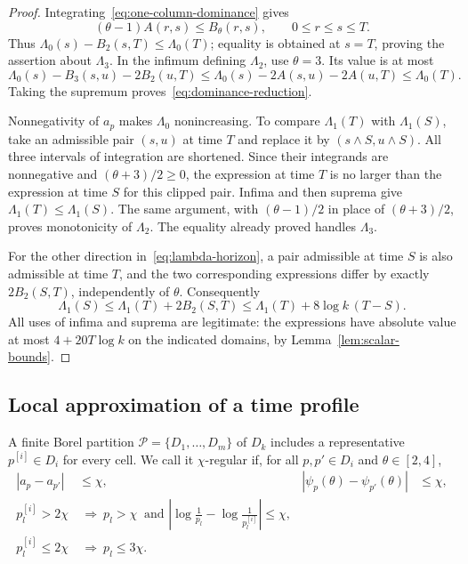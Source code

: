 \documentclass[11pt]{article}
\numberwithin{equation}{section}
\theoremstyle{definition}
\theoremstyle{remark}
\newcommand{\1}{\mathbf 1}
\begin{document}
\begin{proof}
Integrating~\eqref{eq:one-column-dominance} gives
\[
 (\theta-1)A(r,s)\le B_\theta(r,s),\qquad 0\le r\le s\le T.
\]
Thus $\Lambda_0(s)-B_2(s,T)\le\Lambda_0(T)$; equality is obtained at
$s=T$, proving the assertion about $\Lambda_3$. In the infimum defining
$\Lambda_2$, use $\theta=3$. Its value is at most
\[
 \Lambda_0(s)-B_3(s,u)-2B_2(u,T)
 \le\Lambda_0(s)-2A(s,u)-2A(u,T)
 \le\Lambda_0(T).
\]
Taking the supremum proves~\eqref{eq:dominance-reduction}.

Nonnegativity of $a_p$ makes $\Lambda_0$ nonincreasing. To compare
$\Lambda_1(T)$ with $\Lambda_1(S)$, take an admissible pair $(s,u)$ at
time $T$ and replace it by $(s\wedge S,u\wedge S)$. All three intervals
of integration are shortened. Since their integrands are nonnegative
and $(\theta+3)/2\ge0$, the expression at time $T$ is no larger than
the expression at time $S$ for this clipped pair. Infima and then
suprema give $\Lambda_1(T)\le\Lambda_1(S)$. The same argument, with
$(\theta-1)/2$ in place of $(\theta+3)/2$, proves monotonicity of
$\Lambda_2$. The equality already proved handles $\Lambda_3$.

For the other direction in~\eqref{eq:lambda-horizon}, a pair admissible
at time $S$ is also admissible at time $T$, and the two corresponding
expressions differ by exactly $2B_2(S,T)$, independently of $\theta$.
Consequently
\[
 \Lambda_1(S)\le\Lambda_1(T)+2B_2(S,T)
 \le\Lambda_1(T)+8\log k\,(T-S).
\]
All uses of infima and suprema are legitimate: the expressions have
absolute value at most $4+20T\log k$ on the indicated domains, by
Lemma~\ref{lem:scalar-bounds}.
\end{proof}

\subsection{Local approximation of a time profile}
\label{subsec:profile-approximation}

A finite Borel partition $\mathcal P=\{D_1,\ldots,D_m\}$ of $D_k$
includes a representative $p^{[i]}\in D_i$ for every cell. We call it
$\chi$-regular if, for all $p,p'\in D_i$ and $\theta\in[2,4]$,
\begin{align}%
\label{eq:partition-regularity}
 |a_p-a_{p'}|&\le\chi,&
 |\psi_p(\theta)-\psi_{p'}(\theta)|&\le\chi,\nonumber\\
 p^{[i]}_l>2\chi&\ \Longrightarrow\
 p_l>\chi\ \text{ and }\left|\log\frac1{p_l}-\log\frac1{p^{[i]}_l}\right|\le\chi,
 \nonumber\\
 p^{[i]}_l\le2\chi&\ \Longrightarrow\ p_l\le3\chi.
\end{align}
\end{document}
